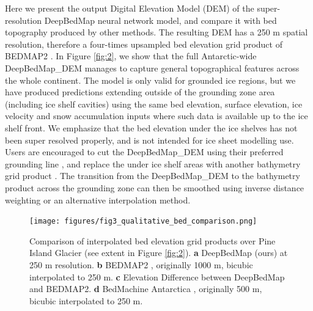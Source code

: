 \documentclass[tc, manuscript]{copernicus}
\begin{document}
Here we present the output Digital Elevation Model (DEM) of the super-resolution DeepBedMap neural network model, and compare it with bed topography produced by other methods.
The resulting DEM has a 250 m spatial resolution, therefore a four-times upsampled bed elevation grid product of BEDMAP2 \citep{FretwellBedmap2improvedice2013}.
In Figure \ref{fig:2}, we show that the full Antarctic-wide DeepBedMap\_DEM manages to capture general topographical features across the whole continent.
The model is only valid for grounded ice regions, but we have produced predictions extending outside of the grounding zone area (including ice shelf cavities) using the same bed elevation, surface elevation, ice velocity and snow accumulation inputs where such data is available up to the ice shelf front.
We emphasize that the bed elevation under the ice shelves has not been super resolved properly, and is not intended for ice sheet modelling use.
Users are encouraged to cut the DeepBedMap\_DEM using their preferred grounding line \citep[e.g.][]{BindschadlerGettingAntarcticanew2011,RignotAntarcticgroundingline2011,MouginotMEaSURESAntarcticBoundaries2017}, and replace the under ice shelf areas with another bathymetry grid product \citep[e.g.][]{GEBCOCompilationGroupGEBCO2020Grid2020}.
The transition from the DeepBedMap\_DEM to the bathymetry product across the grounding zone can then be smoothed using inverse distance weighting or an alternative interpolation method.

\begin{figure}[htbp]
  \texttt{[image: figures/fig3\_qualitative\_bed\_comparison.png]}
  \caption{
    Comparison of interpolated bed elevation grid products over Pine Island Glacier (see extent in Figure \ref{fig:2}).
    \textbf{a} DeepBedMap (ours) at 250 m resolution.
    \textbf{b} BEDMAP2 \citep{FretwellBedmap2improvedice2013}, originally 1000 m, bicubic interpolated to 250 m.
    \textbf{c} Elevation Difference between DeepBedMap and BEDMAP2.
    \textbf{d} BedMachine Antarctica \citep{MorlighemMEaSUREsBedMachineAntarctica2019}, originally 500 m, bicubic interpolated to 250 m.
  }
  \label{fig:3}
\end{figure}
\end{document}
